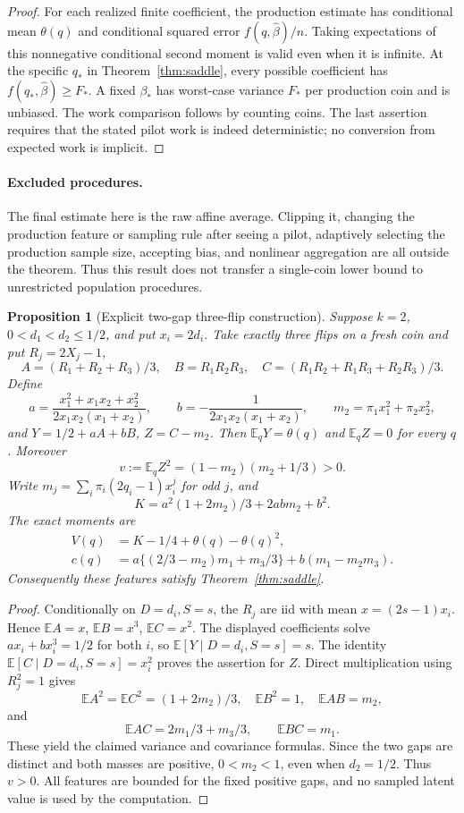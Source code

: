 \documentclass[11pt]{article}
\newtheorem{proposition}[theorem]{Proposition}
\newcommand{\E}{\mathbb E}
\begin{document}
\begin{proof}
For each realized finite coefficient, the production estimate has conditional
mean $\theta(q)$ and conditional squared error $f(q,\widehat\beta)/n$.
Taking expectations of this nonnegative conditional second moment is valid
even when it is infinite. At the specific $q_*$ in
Theorem~\ref{thm:saddle}, every possible coefficient has
$f(q_*,\widehat\beta)\ge F_*$. A fixed $\beta_*$ has worst-case variance
$F_*$ per production coin and is unbiased. The work comparison follows by
counting coins. The last assertion requires that the stated pilot work is
indeed deterministic; no conversion from expected work is implicit.
\end{proof}

\paragraph{Excluded procedures.}
The final estimate here is the raw affine average. Clipping it, changing the
production feature or sampling rule after seeing a pilot, adaptively selecting
the production sample size, accepting bias, and nonlinear aggregation are all
outside the theorem. Thus this result does not transfer a single-coin lower
bound to unrestricted population procedures.

\begin{proposition}[Explicit two-gap three-flip construction]\label{prop:two}
Suppose $k=2$, $0<d_1<d_2\le1/2$, and put $x_i=2d_i$. Take exactly three
flips on a fresh coin and put $R_j=2X_j-1$,
\[
 A=(R_1+R_2+R_3)/3,\quad B=R_1R_2R_3,\quad
 C=(R_1R_2+R_1R_3+R_2R_3)/3.
\]
Define
\[
 a=\frac{x_1^2+x_1x_2+x_2^2}{2x_1x_2(x_1+x_2)},\qquad
 b=-\frac1{2x_1x_2(x_1+x_2)},\qquad
 m_2=\pi_1x_1^2+\pi_2x_2^2,
\]
and $Y=1/2+aA+bB$, $Z=C-m_2$. Then $\E_qY=\theta(q)$ and
$\E_qZ=0$ for every $q$. Moreover
\[
 v:=\E_q Z^2=(1-m_2)(m_2+1/3)>0.
\]
Write $m_j=\sum_i\pi_i(2q_i-1)x_i^j$ for odd $j$, and
\[
 K=a^2(1+2m_2)/3+2abm_2+b^2.
\]
The exact moments are
\begin{align*}
 V(q)&=K-1/4+\theta(q)-\theta(q)^2,\\
 c(q)&=a\{(2/3-m_2)m_1+m_3/3\}+b(m_1-m_2m_3).
\end{align*}
Consequently these features satisfy Theorem~\ref{thm:saddle}.
\end{proposition}

\begin{proof}
Conditionally on $D=d_i,S=s$, the $R_j$ are iid with mean
$x=(2s-1)x_i$. Hence $\E A=x$, $\E B=x^3$, $\E C=x^2$.
The displayed coefficients solve $ax_i+bx_i^3=1/2$ for both $i$, so
$\E[Y\mid D=d_i,S=s]=s$.
The identity $\E[C\mid D=d_i,S=s]=x_i^2$ proves the assertion for $Z$.
Direct multiplication using $R_j^2=1$ gives
\[
 \E A^2=\E C^2=(1+2m_2)/3,\quad \E B^2=1,\quad
 \E AB=m_2,
\]
and
\[
 \E AC=2m_1/3+m_3/3,\qquad \E BC=m_1.
\]
These yield the claimed variance and covariance formulas. Since the two
gaps are distinct and both masses are positive, $0<m_2<1$, even when
$d_2=1/2$. Thus $v>0$. All features are bounded for the fixed positive gaps,
and no sampled latent value is used by the computation.
\end{proof}
\end{document}
